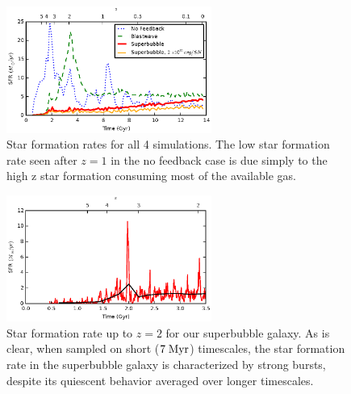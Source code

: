 \begin{figure}
    \includegraphics[width=0.6\textwidth]{figures2/sfr.eps}
    \caption[Star formation rate as a function of feedback model]{Star formation
    rates for all 4 simulations.  The low star formation rate seen after $z=1$
    in the no feedback case is due simply to the high z star formation consuming
    most of the available gas.}
    \label{sfr2}
\end{figure}
\begin{figure}
    \includegraphics[width=0.6\textwidth]{figures2/burstiness.eps}
    \caption[Superbubble star formation burstiness]{Star formation rate up to
    $z=2$ for our superbubble galaxy.  As is clear, when sampled on short ($7\;
    \rm{Myr}$) timescales, the star formation rate in the superbubble galaxy is
    characterized by strong bursts, despite its quiescent behavior averaged over
    longer timescales.}
    \label{burstiness2}
\end{figure}
